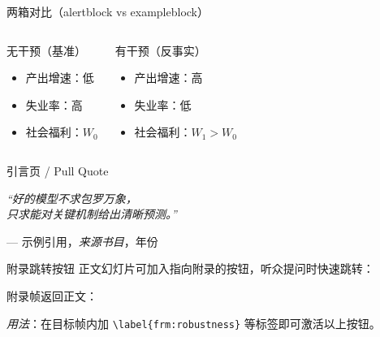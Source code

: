 \begin{frame}{两箱对比（alertblock vs exampleblock）}
  \begin{columns}[T]
      \begin{alertblock}{无干预（基准）}
        \begin{itemize}
          \item 产出增速：低
          \item 失业率：高
          \item 社会福利：$W_0$
        \end{itemize}
      \end{alertblock}
      \begin{exampleblock}{有干预（反事实）}
        \begin{itemize}
          \item 产出增速：高
          \item 失业率：低
          \item 社会福利：$W_1 > W_0$
        \end{itemize}
      \end{exampleblock}
  \end{columns}
\end{frame}

\begin{frame}{引言页 / Pull Quote}
  \vspace*{\fill}
  \begin{center}
    \Large\itshape
    ``好的模型不求包罗万象，\\
    只求能对关键机制给出清晰预测。''
    \vspace{0.9em}

    \normalsize\upshape
    --- 示例引用，\textit{来源书目}，年份
  \end{center}
  \vspace*{\fill}
\end{frame}

\begin{frame}{附录跳转按钮}
  正文幻灯片可加入指向附录的按钮，听众提问时快速跳转：

  \medskip
  \hyperlink{frm:robustness}{}
  \hspace{1em}
  \hyperlink{frm:derivation}{}
  \hspace{1em}
  \hyperlink{frm:data}{}

  \bigskip
  附录帧返回正文：

  \medskip
  \hyperlink{frm:main-results}{}
  \hspace{1em}
  \hyperlink{frm:empirics}{}

  \bigskip
  {\footnotesize \textit{用法}：在目标帧内加
    \texttt{\textbackslash label\{frm:robustness\}} 等标签即可激活以上按钮。}
\end{frame}
